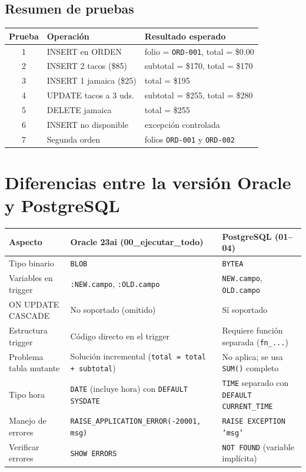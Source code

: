 \documentclass[12pt, a4paper]{article}
\begin{document}
\subsection{Resumen de pruebas}

\begin{center}
\begin{tabularx}{\textwidth}{clX}
    \toprule
    \textbf{Prueba} & \textbf{Operaci\'on} & \textbf{Resultado esperado} \\
    \midrule
    1 & INSERT en ORDEN         & folio = \texttt{ORD-001}, total = \$0.00 \\
    2 & INSERT 2 tacos (\$85)   & subtotal = \$170, total = \$170 \\
    3 & INSERT 1 jamaica (\$25) & total = \$195 \\
    4 & UPDATE tacos a 3 uds.   & subtotal = \$255, total = \$280 \\
    5 & DELETE jamaica          & total = \$255 \\
    6 & INSERT no disponible    & excepci\'on controlada \\
    7 & Segunda orden           & folios \texttt{ORD-001} y \texttt{ORD-002} \\
    \bottomrule
\end{tabularx}
\end{center}

\section{Diferencias entre la versi\'on Oracle y PostgreSQL}

\begin{center}
\begin{tabularx}{\textwidth}{lXX}
    \toprule
    \textbf{Aspecto} & \textbf{Oracle 23ai (00\_ejecutar\_todo)} & \textbf{PostgreSQL (01--04)} \\
    \midrule
    Tipo binario     & \texttt{BLOB}            & \texttt{BYTEA} \\
    Variables en trigger & \texttt{:NEW.campo}, \texttt{:OLD.campo} & \texttt{NEW.campo}, \texttt{OLD.campo} \\
    ON UPDATE CASCADE & No soportado (omitido)  & S\'i soportado \\
    Estructura trigger & C\'odigo directo en el trigger & Requiere funci\'on separada (\texttt{fn\_...}) \\
    Problema tabla mutante & Soluci\'on incremental (\texttt{total = total + subtotal}) & No aplica; se usa \texttt{SUM()} completo \\
    Tipo hora        & \texttt{DATE} (incluye hora) con \texttt{DEFAULT SYSDATE} & \texttt{TIME} separado con \texttt{DEFAULT CURRENT\_TIME} \\
    Manejo de errores & \texttt{RAISE\_APPLICATION\_ERROR(-20001, msg)} & \texttt{RAISE EXCEPTION 'msg'} \\
    Verificar errores & \texttt{SHOW ERRORS}     & \texttt{NOT FOUND} (variable impl\'icita) \\
    \bottomrule
\end{tabularx}
\end{center}
\end{document}
